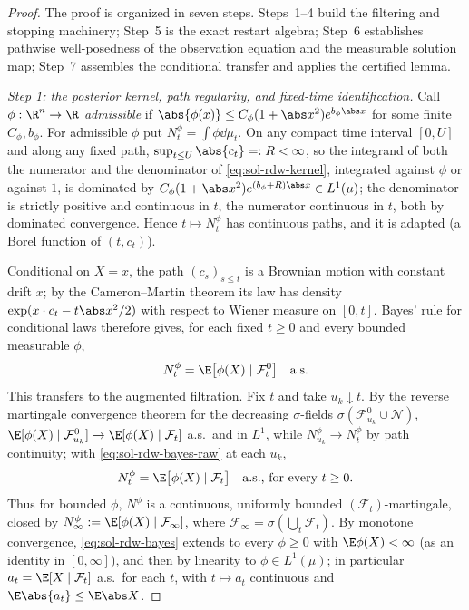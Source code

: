 \documentclass[../main.tex]{subfiles}
\begin{document}
\begin{proof}
The proof is organized in seven steps.  Steps~1--4 build the filtering and stopping
machinery; Step~5 is the exact restart algebra; Step~6 establishes pathwise
well-posedness of the observation equation and the measurable solution map; Step~7
assembles the conditional transfer and applies the certified lemma.

\medskip
\noindent\emph{Step 1: the posterior kernel, path regularity, and fixed-time
identification.}
Call $\phi:\R^n\to\R$ \emph{admissible} if
$\abs{\phi(x)}\le C_\phi(1+\abs x^2)e^{b_\phi\abs x}$ for some finite $C_\phi,b_\phi$.
For admissible $\phi$ put $N^\phi_t=\int\phi\dd\mu_t$.  On any compact time interval
$[0,U]$ and along any fixed path, $\sup_{t\le U}\abs{c_t}=:R<\infty$, so the integrand
of both the numerator and the denominator of \eqref{eq:sol-rdw-kernel}, integrated
against $\phi$ or against $1$, is dominated by $C_\phi(1+\abs x^2)e^{(b_\phi+R)\abs x}
\in L^1(\mu)$; the denominator is strictly positive and continuous in $t$, the
numerator continuous in $t$, both by dominated convergence.  Hence $t\mapsto N^\phi_t$
has continuous paths, and it is adapted (a Borel function of $(t,c_t)$).

Conditional on $X=x$, the path $(c_s)_{s\le t}$ is a Brownian motion with constant
drift $x$; by the Cameron--Martin theorem its law has density
$\exp(x\cdot c_t-t\abs x^2/2)$ with respect to Wiener measure on $[0,t]$.  Bayes' rule
for conditional laws therefore gives, for each fixed $t\ge0$ and every bounded
measurable $\phi$,
\begin{equation}
  N^\phi_t=\E\bigl[\phi(X)\mid\mathcal F^0_t\bigr]\quad\text{a.s.}
  \label{eq:sol-rdw-bayes-raw}
\end{equation}
This transfers to the augmented filtration.  Fix $t$ and take $u_k\downarrow t$.  By
the reverse martingale convergence theorem for the decreasing $\sigma$-fields
$\sigma(\mathcal F^0_{u_k}\cup\mathcal N)$,
$\E[\phi(X)\mid\mathcal F^0_{u_k}]\to\E[\phi(X)\mid\mathcal F_t]$ a.s.\ and in $L^1$,
while $N^\phi_{u_k}\to N^\phi_t$ by path continuity; with
\eqref{eq:sol-rdw-bayes-raw} at each $u_k$,
\begin{equation}
  N^\phi_t=\E\bigl[\phi(X)\mid\mathcal F_t\bigr]\quad\text{a.s., for every }t\ge0 .
  \label{eq:sol-rdw-bayes}
\end{equation}
Thus for bounded $\phi$, $N^\phi$ is a continuous, uniformly bounded
$(\mathcal F_t)$-martingale, closed by
$N^\phi_\infty:=\E[\phi(X)\mid\mathcal F_\infty]$, where
$\mathcal F_\infty=\sigma(\bigcup_t\mathcal F_t)$.  By monotone convergence,
\eqref{eq:sol-rdw-bayes} extends to every $\phi\ge0$ with $\E\phi(X)<\infty$ (as an
identity in $[0,\infty]$), and then by linearity to $\phi\in L^1(\mu)$; in particular
$a_t=\E[X\mid\mathcal F_t]$ a.s.\ for each $t$, with $t\mapsto a_t$ continuous and
$\E\abs{a_t}\le\E\abs X$.


\end{proof}
\end{document}
